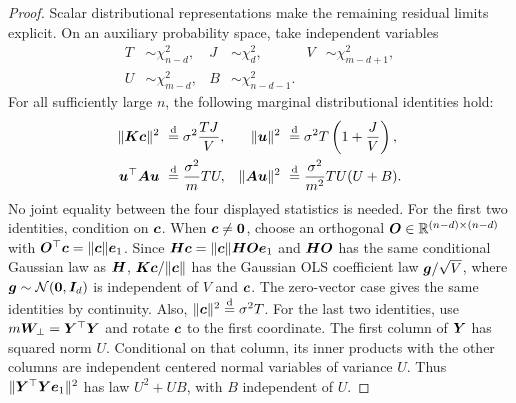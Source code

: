 \documentclass{article}
\theoremstyle{plain} %
\theoremstyle{definition} %
\theoremstyle{definition} %
\begin{document}
\begin{proof}
Scalar distributional representations make the remaining residual limits
explicit. On an auxiliary probability space, take independent variables
\begin{align*}
    T&\sim\chi^2_{n-d}, & J&\sim\chi^2_d,
    & V&\sim\chi^2_{m-d+1},\\
    U&\sim\chi^2_{m-d}, & B&\sim\chi^2_{n-d-1}.
\end{align*}
For all sufficiently large $n$, the following marginal distributional
identities hold:
\begin{align*}
    \lVert\boldsymbol{K}\boldsymbol{c}\rVert^2&\ \stackrel{\rm d}{=}
       \sigma^2\frac{TJ}{V},
    &
    \lVert\boldsymbol{u}\rVert^2&\ \stackrel{\rm d}{=}
       \sigma^2T\left(1+\frac JV\right),\\
    \boldsymbol{u}^\top\boldsymbol{A}\boldsymbol{u}&\ \stackrel{\rm d}{=}
       \frac{\sigma^2}{m}TU,
    &
    \lVert\boldsymbol{A}\boldsymbol{u}\rVert^2&\ \stackrel{\rm d}{=}
       \frac{\sigma^2}{m^2}TU(U+B).
\end{align*}
No joint equality between the four displayed statistics is needed.
For the first two identities, condition on $\boldsymbol{c}$. When $\boldsymbol{c}\ne\mathbf{0}$,
choose an orthogonal $\boldsymbol{O}\in{\mathbb{R}}^{(n-d)\times(n-d)}$ with
$\boldsymbol{O}^\top\boldsymbol{c}=\lVert\boldsymbol{c}\rVert\boldsymbol{e}_1$. Since
$\boldsymbol{H}\boldsymbol{c}=\lVert\boldsymbol{c}\rVert\boldsymbol{H}\boldsymbol{O}\boldsymbol{e}_1$ and $\boldsymbol{H}\boldsymbol{O}$ has the same conditional
Gaussian law as $\boldsymbol{H}$, $\boldsymbol{K}\boldsymbol{c}/\lVert\boldsymbol{c}\rVert$ has the Gaussian OLS coefficient law
$\boldsymbol{g}/\sqrt V$, where $\boldsymbol{g}\sim{\mathcal N}(\mathbf{0},\boldsymbol{I}_d)$ is independent
of $V$ and $\boldsymbol{c}$. The zero-vector case gives the same identities by
continuity. Also, $\lVert\boldsymbol{c}\rVert^2\stackrel{\rm d}{=}\sigma^2T$.
For the last two identities, use $m\boldsymbol{W}_\perp=\boldsymbol{Y}^\top\boldsymbol{Y}$ and rotate
$\boldsymbol{c}$ to the first coordinate. The first column of $\boldsymbol{Y}$ has squared
norm $U$. Conditional on that column, its inner products with the other
columns are independent centered normal variables of variance $U$.
Thus $\lVert\boldsymbol{Y}^\top\boldsymbol{Y}\boldsymbol{e}_1\rVert^2$ has law $U^2+UB$, with $B$
independent of $U$.


\end{proof}
\end{document}
